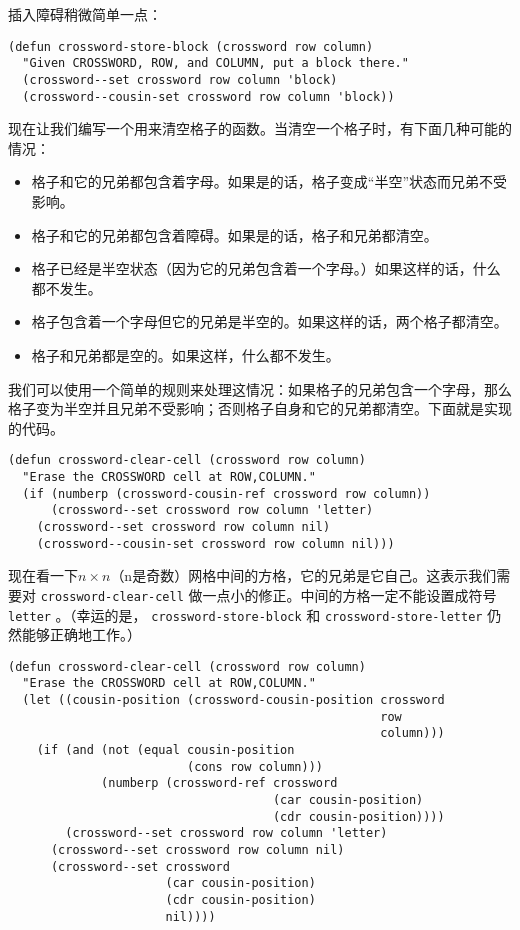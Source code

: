 插入障碍稍微简单一点：

\begin{verbatim}
(defun crossword-store-block (crossword row column)
  "Given CROSSWORD, ROW, and COLUMN, put a block there."
  (crossword--set crossword row column 'block)
  (crossword--cousin-set crossword row column 'block))
\end{verbatim}

现在让我们编写一个用来清空格子的函数。当清空一个格子时，有下面几种可能的情况：

\begin{itemize}
  \item 格子和它的兄弟都包含着字母。如果是的话，格子变成“半空”状态而兄弟不受影响。
  \item 格子和它的兄弟都包含着障碍。如果是的话，格子和兄弟都清空。
  \item 格子已经是半空状态（因为它的兄弟包含着一个字母。）如果这样的话，什么都不发生。
  \item 格子包含着一个字母但它的兄弟是半空的。如果这样的话，两个格子都清空。
  \item 格子和兄弟都是空的。如果这样，什么都不发生。
\end{itemize}

我们可以使用一个简单的规则来处理这情况：如果格子的兄弟包含一个字母，那么格子变为半空并且兄弟不受影响；否则格子自身和它的兄弟都清空。下面就是实现的代码。

\begin{verbatim}
(defun crossword-clear-cell (crossword row column)
  "Erase the CROSSWORD cell at ROW,COLUMN."
  (if (numberp (crossword-cousin-ref crossword row column))
      (crossword--set crossword row column 'letter)
    (crossword--set crossword row column nil)
    (crossword--cousin-set crossword row column nil)))
\end{verbatim}

现在看一下$n \times n$（n是奇数）网格中间的方格，它的兄弟是它自己。这表示我们需要对 \texttt{crossword-clear-cell} 做一点小的修正。中间的方格一定不能设置成符号 \texttt{letter} 。（幸运的是， \texttt{crossword-store-block} 和 \texttt{crossword-store-letter} 仍然能够正确地工作。）

\begin{verbatim}
(defun crossword-clear-cell (crossword row column)
  "Erase the CROSSWORD cell at ROW,COLUMN."
  (let ((cousin-position (crossword-cousin-position crossword
                                                    row
                                                    column)))
    (if (and (not (equal cousin-position
                         (cons row column)))
             (numberp (crossword-ref crossword
                                     (car cousin-position)
                                     (cdr cousin-position))))
        (crossword--set crossword row column 'letter)
      (crossword--set crossword row column nil)
      (crossword--set crossword
                      (car cousin-position)
                      (cdr cousin-position)
                      nil))))
\end{verbatim}

